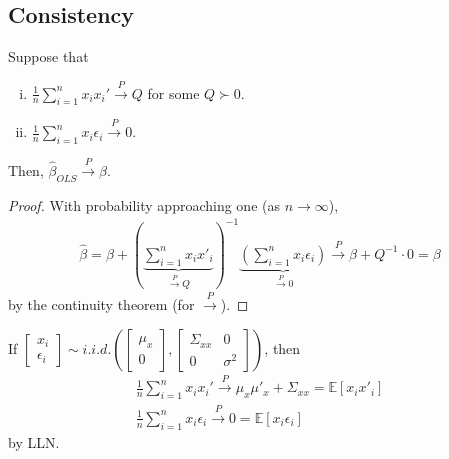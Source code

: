 \documentclass[11pt]{elegantbook}
\begin{document}
\subsection{Consistency}
\begin{lemma}[Consistency]\label{lemma:consistency}
    Suppose that
    \begin{enumerate}[(i).]
        \item $\frac{1}{n}\sum_{i=1}^n x_ix_i' \stackrel{P}{\longrightarrow} Q$ for some $Q\succ 0$.
        \item $\frac{1}{n}\sum_{i=1}^n x_i\epsilon_i \stackrel{P}{\longrightarrow} 0$.
    \end{enumerate}
    Then, $\hat{\beta}_{OLS} \stackrel{P}{\longrightarrow} \beta$.
\end{lemma}
\begin{proof}
    With probability approaching one (as $n\to\infty$),
    \begin{equation}
        \begin{aligned}
            \hat{\beta}=\beta+\left(\underbrace{\sum_{i=1}^n x_ix'_i}_{\stackrel{P}{\longrightarrow} Q}\right)^{-1}\underbrace{\left(\sum_{i=1}^n x_i\epsilon_i\right)}_{\stackrel{P}{\longrightarrow} 0}\stackrel{P}{\longrightarrow} \beta + Q^{-1}\cdot 0=\beta
        \end{aligned}
        \nonumber
    \end{equation}
    by the continuity theorem (for $\stackrel{P}{\longrightarrow}$).
\end{proof}
\begin{remark}
    If $\begin{bmatrix}
        x_i\\
        \epsilon_i
    \end{bmatrix}\sim i.i.d. \left(\begin{bmatrix}
        \mu_x\\
        0
    \end{bmatrix},\begin{bmatrix}
        \Sigma_{xx}&	0\\
        0 & \sigma^2
    \end{bmatrix}\right)$, then
    \begin{equation}
        \begin{aligned}
            \frac{1}{n}\sum_{i=1}^n x_ix_i' \stackrel{P}{\longrightarrow} \mu_x\mu'_x+\Sigma_{xx}=\mathbb{E}[x_ix'_i]\\
            \frac{1}{n}\sum_{i=1}^n x_i\epsilon_i \stackrel{P}{\longrightarrow} 0=\mathbb{E}[x_i\epsilon_i]
        \end{aligned}
        \nonumber
    \end{equation}
    by LLN.
\end{remark}
\end{document}

